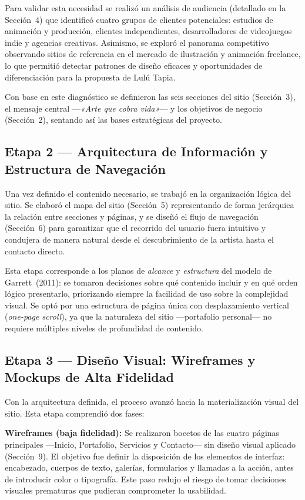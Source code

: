 \documentclass[12pt, letterpaper]{article}
\begin{document}
Para validar esta necesidad se realizó un análisis de audiencia (detallado en la Sección~4) que identificó cuatro grupos de clientes potenciales: estudios de animación y producción, clientes independientes, desarrolladores de videojuegos indie y agencias creativas. Asimismo, se exploró el panorama competitivo observando sitios de referencia en el mercado de ilustración y animación freelance, lo que permitió detectar patrones de diseño eficaces y oportunidades de diferenciación para la propuesta de Lulú Tapia.

Con base en este diagnóstico se definieron las seis secciones del sitio (Sección~3), el mensaje central —\textit{«Arte que cobra vida»}— y los objetivos de negocio (Sección~2), sentando así las bases estratégicas del proyecto.

\subsection{Etapa 2 — Arquitectura de Información y Estructura de Navegación}

Una vez definido el contenido necesario, se trabajó en la organización lógica del sitio. Se elaboró el mapa del sitio (Sección~5) representando de forma jerárquica la relación entre secciones y páginas, y se diseñó el flujo de navegación (Sección~6) para garantizar que el recorrido del usuario fuera intuitivo y condujera de manera natural desde el descubrimiento de la artista hasta el contacto directo.

Esta etapa corresponde a los planos de \textit{alcance} y \textit{estructura} del modelo de Garrett~(2011): se tomaron decisiones sobre qué contenido incluir y en qué orden lógico presentarlo, priorizando siempre la facilidad de uso sobre la complejidad visual. Se optó por una estructura de página única con desplazamiento vertical (\textit{one-page scroll}), ya que la naturaleza del sitio —portafolio personal— no requiere múltiples niveles de profundidad de contenido.

\subsection{Etapa 3 — Diseño Visual: Wireframes y Mockups de Alta Fidelidad}

Con la arquitectura definida, el proceso avanzó hacia la materialización visual del sitio. Esta etapa comprendió dos fases:

\textbf{Wireframes (baja fidelidad):} Se realizaron bocetos de las cuatro páginas principales —Inicio, Portafolio, Servicios y Contacto— sin diseño visual aplicado (Sección~9). El objetivo fue definir la disposición de los elementos de interfaz: encabezado, cuerpos de texto, galerías, formularios y llamadas a la acción, antes de introducir color o tipografía. Este paso redujo el riesgo de tomar decisiones visuales prematuras que pudieran comprometer la usabilidad.
\end{document}
